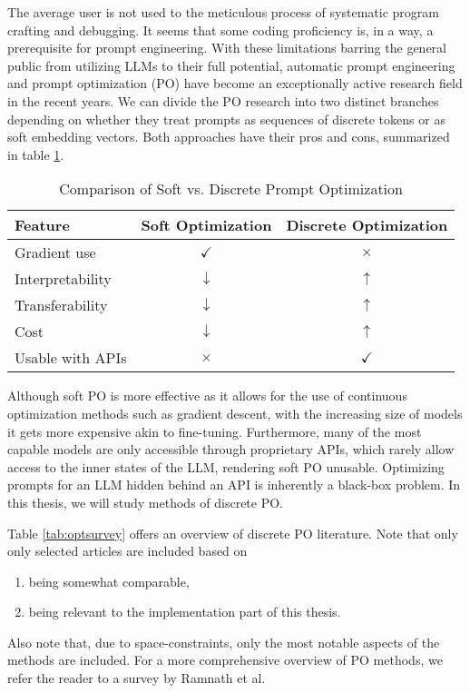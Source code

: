 The average user is not used to the meticulous process of systematic program crafting and debugging. It seems that
some coding proficiency is, in a way, a prerequisite for prompt engineering. With these limitations barring the general public from utilizing LLMs to their full potential,
automatic prompt engineering and prompt optimization (PO) have become an exceptionally active research field in the recent years.
\newpage
We can divide the PO research into two distinct branches depending on whether 
they treat prompts as sequences of discrete tokens or as soft embedding vectors. 
Both approaches have their pros and cons, summarized in table \ref{tab:disxcont}.
\begin{table}[htbp]
    \centering
    \caption{Comparison of Soft vs. Discrete Prompt Optimization}\label{tab:disxcont}
    \begin{tabular}{lcc}
    \toprule
    \textbf{Feature} & \textbf{Soft Optimization} & \textbf{Discrete Optimization} \\
    \midrule
    Gradient use      & $\checkmark$   & $\times$ \\
    Interpretability  & $\downarrow$ & $\uparrow$ \\
    Transferability  & $\downarrow$ & $\uparrow$ \\
    Cost  & $\downarrow$ & $\uparrow$ \\
    Usable with APIs  & $\times$   & $\checkmark$ \\
    \bottomrule
    \end{tabular}
    \end{table}

Although soft PO is more effective as it allows for the use of 
continuous optimization methods such as gradient descent, with the increasing size of models
it gets more expensive akin to fine-tuning. Furthermore, many of the most capable models are 
only accessible through proprietary APIs, which rarely allow access to the inner states of the LLM,
rendering soft PO unusable.
Optimizing prompts for an LLM hidden behind an API is inherently a black-box problem. 
In this thesis, we will study methods of discrete PO.

Table \ref{tab:optsurvey} offers an overview of discrete PO literature. Note that only only selected articles are included based on
\begin{enumerate}
    \item being somewhat comparable,
    \item being relevant to the implementation part of this thesis.
\end{enumerate}
Also note that, due to space-constraints, only the most notable aspects of the methods are included. 
For a more comprehensive overview of PO methods, we refer the reader to a survey\cite{ramnath2025systematicsurveyautomaticprompt} by Ramnath et al.

